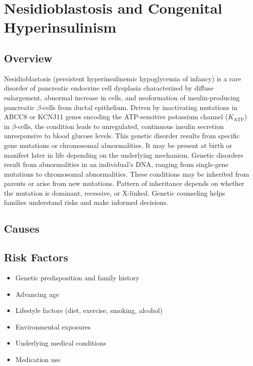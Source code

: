 \chapter{Nesidioblastosis and Congenital Hyperinsulinism}
\label{sec:Nesidioblastosis and Congenital Hyperinsulinism}

\section{Overview}
Nesidioblastosis (persistent hyperinsulinemic hypoglycemia of infancy) is a rare disorder of pancreatic endocrine cell dysplasia characterized by diffuse enlargement, abnormal increase in cells, and neoformation of insulin-producing pancreatic $\beta$-cells from ductal epithelium. Driven by inactivating mutations in ABCC8 or KCNJ11 genes encoding the ATP-sensitive potassium channel ($K_{\text{ATP}}$) in $\beta$-cells, the condition leads to unregulated, continuous insulin secretion unresponsive to blood glucose levels. This genetic disorder results from specific gene mutations or chromosomal abnormalities. It may be present at birth or manifest later in life depending on the underlying mechanism. Genetic disorders result from abnormalities in an individual's DNA, ranging from single-gene mutations to chromosomal abnormalities. These conditions may be inherited from parents or arise from new mutations. Pattern of inheritance depends on whether the mutation is dominant, recessive, or X-linked. Genetic counseling helps families understand risks and make informed decisions.
\section{Causes}
\section{Risk Factors}

\begin{itemize}[noitemsep]
  \item Genetic predisposition and family history
  \item Advancing age
  \item Lifestyle factors (diet, exercise, smoking, alcohol)
  \item Environmental exposures
  \item Underlying medical conditions
  \item Medication use
\end{itemize}
